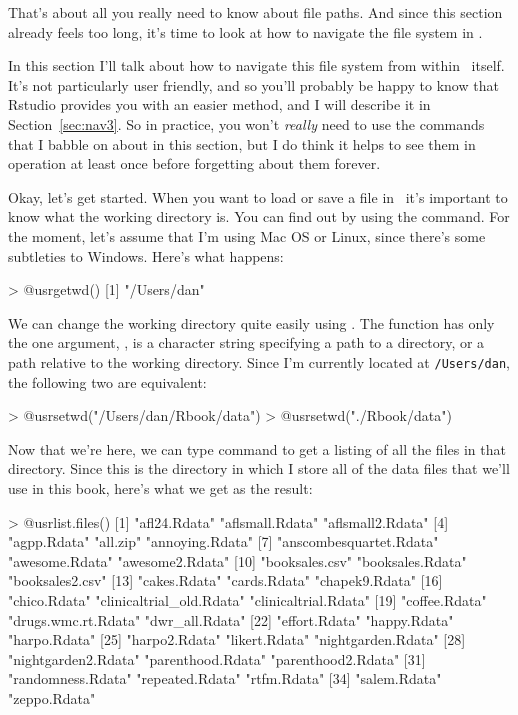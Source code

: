 That's about all you really need to know about file paths. And since this section already feels too long, it's time to look at how to navigate the file system in \R. 


In this section I'll talk about how to navigate this file system from within \R\ itself. It's not particularly user friendly, and so you'll probably be happy to know that Rstudio provides you with an easier method, and I will describe it in Section~\ref{sec:nav3}. So in practice, you won't {\it really} need to use the commands that I babble on about in this section, but I do think it helps to see them in operation at least once before forgetting about them forever.

Okay, let's get started. When you want to load or save a file in \R\ it's important to know what the working directory is. You can find out by using the  command. For the moment, let's assume that I'm using Mac OS or Linux, since there's some subtleties to Windows. Here's what happens:
\begin{rblock1}
> @usr{getwd()}
[1] "/Users/dan"
\end{rblock1}
We can change the working directory quite easily using . The  function has only the one argument, ,  is a character string specifying a path to a directory, or a path relative to the working directory. Since I'm currently located at \verb#/Users/dan#, the following two are equivalent: 
\begin{rblock1}
> @usr{setwd("/Users/dan/Rbook/data")}
> @usr{setwd("./Rbook/data")}
\end{rblock1}
Now that we're here, we can type  command to get a listing of all the files in that directory. Since this is the directory in which I store all of the data files that we'll use in this book, here's what we get as the result:
\begin{rblock1}
> @usr{list.files()}
 [1] "afl24.Rdata"             "aflsmall.Rdata"          "aflsmall2.Rdata"        
 [4] "agpp.Rdata"              "all.zip"                 "annoying.Rdata"         
 [7] "anscombesquartet.Rdata"  "awesome.Rdata"           "awesome2.Rdata"         
[10] "booksales.csv"           "booksales.Rdata"         "booksales2.csv"         
[13] "cakes.Rdata"             "cards.Rdata"             "chapek9.Rdata"          
[16] "chico.Rdata"             "clinicaltrial_old.Rdata" "clinicaltrial.Rdata"    
[19] "coffee.Rdata"            "drugs.wmc.rt.Rdata"      "dwr_all.Rdata"          
[22] "effort.Rdata"            "happy.Rdata"             "harpo.Rdata"            
[25] "harpo2.Rdata"            "likert.Rdata"            "nightgarden.Rdata"      
[28] "nightgarden2.Rdata"      "parenthood.Rdata"        "parenthood2.Rdata"      
[31] "randomness.Rdata"        "repeated.Rdata"          "rtfm.Rdata"             
[34] "salem.Rdata"             "zeppo.Rdata"
\end{rblock1}
